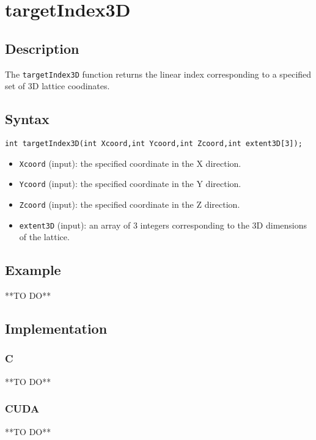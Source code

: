 \newpage
\section{targetIndex3D}

\subsection{Description}

The \verb+targetIndex3D+ function returns the linear index corresponding to a specified set of 3D lattice coodinates.

\subsection{Syntax}
\begin{verbatim}
int targetIndex3D(int Xcoord,int Ycoord,int Zcoord,int extent3D[3]);
\end{verbatim}

\begin{itemize}
\item \verb+Xcoord+ (input): the specified coordinate in the X direction.
\item \verb+Ycoord+ (input): the specified coordinate in the Y direction.
\item \verb+Zcoord+ (input): the specified coordinate in the Z direction.
\item \verb+extent3D+ (input): an array of 3 integers corresponding to the 3D dimensions of the lattice.
\end{itemize}


\subsection{Example}
**TO DO**
\subsection{Implementation}
\subsubsection{C}
**TO DO**
\subsubsection{CUDA}
**TO DO**
